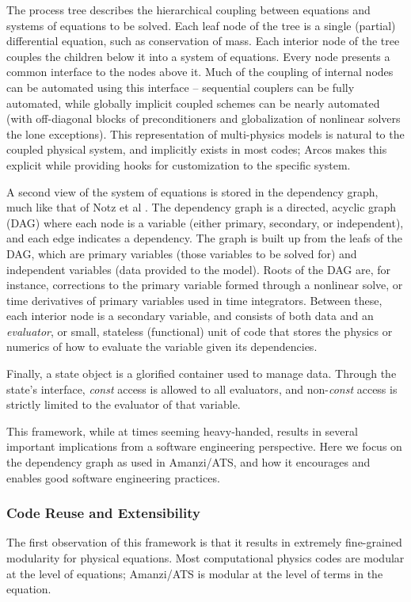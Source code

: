 The process tree describes the hierarchical coupling between equations
and systems of equations to be solved.  Each leaf node of the tree is
a single (partial) differential equation, such as conservation of
mass.  Each interior node of the tree couples the children below it
into a system of equations.  Every node presents a common interface to
the nodes above it.  Much of the coupling of internal nodes can be
automated using this interface -- sequential couplers can be fully
automated, while globally implicit coupled schemes can be nearly
automated (with off-diagonal blocks of preconditioners and
globalization of nonlinear solvers the lone exceptions).  This
representation of multi-physics models is natural to the coupled
physical system, and implicitly exists in most codes; Arcos makes this
explicit while providing hooks for customization to the specific
system.

A second view of the system of equations is stored in the dependency
graph, much like that of Notz et al \cite{Notz2012}.  The dependency
graph is a directed, acyclic graph (DAG) where each node is a variable
(either primary, secondary, or independent), and each edge indicates a
dependency.  The graph is built up from the leafs of the DAG, which
are primary variables (those variables to be solved for) and
independent variables (data provided to the model).  Roots of the DAG
are, for instance, corrections to the primary variable formed through
a nonlinear solve, or time derivatives of primary variables used in
time integrators.  Between these, each interior node is a secondary
variable, and consists of both data and an \emph{evaluator}, or small,
stateless (functional) unit of code that stores the physics or
numerics of how to evaluate the variable given its dependencies.

Finally, a state object is a glorified container used to manage data.
Through the state's interface, \emph{const} access is allowed to all
evaluators, and non-\emph{const} access is strictly limited to the
evaluator of that variable.

This framework, while at times seeming heavy-handed, results in
several important implications from a software engineering
perspective.  Here we focus on the dependency graph as used in
Amanzi/ATS, and how it encourages and enables good software
engineering practices.

\subsubsection{Code Reuse and Extensibility}
\label{sec:amanzi:modularity} The first observation of this framework
is that it results in extremely fine-grained modularity for physical
equations.  Most computational physics codes are modular at the level
of equations; Amanzi/ATS is modular at the level of terms in the
equation.

